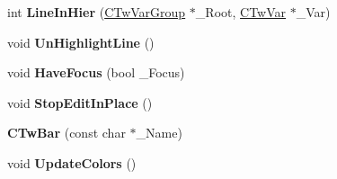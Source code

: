 \begin{DoxyCompactItemize}
\item 
\hypertarget{struct_c_tw_bar_ad766490c63600920ccf4983626c20f48}{int {\bfseries Line\+In\+Hier} (\hyperlink{struct_c_tw_var_group}{C\+Tw\+Var\+Group} $\ast$\+\_\+\+Root, \hyperlink{struct_c_tw_var}{C\+Tw\+Var} $\ast$\+\_\+\+Var)}\label{struct_c_tw_bar_ad766490c63600920ccf4983626c20f48}

\item 
\hypertarget{struct_c_tw_bar_a6a0addb9b20fe0eb919172bb0e921e8b}{void {\bfseries Un\+Highlight\+Line} ()}\label{struct_c_tw_bar_a6a0addb9b20fe0eb919172bb0e921e8b}

\item 
\hypertarget{struct_c_tw_bar_a320e335e394de078f43bf12555d44c49}{void {\bfseries Have\+Focus} (bool \+\_\+\+Focus)}\label{struct_c_tw_bar_a320e335e394de078f43bf12555d44c49}

\item 
\hypertarget{struct_c_tw_bar_aee553239a4176957eaae0e3a5d9d7c7b}{void {\bfseries Stop\+Edit\+In\+Place} ()}\label{struct_c_tw_bar_aee553239a4176957eaae0e3a5d9d7c7b}

\item 
\hypertarget{struct_c_tw_bar_a1cb7a2c9a1052cc7c1c2da532a6aa561}{{\bfseries C\+Tw\+Bar} (const char $\ast$\+\_\+\+Name)}\label{struct_c_tw_bar_a1cb7a2c9a1052cc7c1c2da532a6aa561}

\item 
\hypertarget{struct_c_tw_bar_a3bd9b8d3ec764fbc721818cd3fdc7f8c}{void {\bfseries Update\+Colors} ()}\label{struct_c_tw_bar_a3bd9b8d3ec764fbc721818cd3fdc7f8c}

\end{DoxyCompactItemize}
